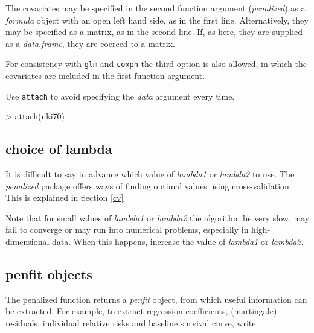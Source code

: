 \documentclass[a4paper]{article}
\newcommand{\Rfunction}[1]{{\texttt{#1}}}
\newcommand{\Rpackage}[1]{{\textit{#1}}}
\newcommand{\Rclass}[1]{{\textit{#1}}}
\newcommand{\Rfunarg}[1]{{\textit{#1}}}
\begin{document}
The covariates may be specified in the second function argument (\Rfunarg{penalized}) as a \Rclass{formula} object with an open left hand side, as in the first line. Alternatively, they may be specified as a matrix, as in the second line. If, as here, they are supplied as a \Rclass{data.frame}, they are coerced to a matrix.

For consistency with \Rfunction{glm} and \Rfunction{coxph} the third option is also allowed, in which the covariates are included in the first function argument.

Use \Rfunction{attach} to avoid specifying the \Rfunarg{data} argument every time.

\begin{Schunk}
\begin{Sinput}
> attach(nki70)
\end{Sinput}
\end{Schunk}

\subsection{choice of lambda}

It is difficult to say in advance which value of \Rfunarg{lambda1} or \Rfunarg{lambda2} to use. The \Rpackage{penalized} package offers ways of finding optimal values using cross-validation. This is explained in Section \ref{cv}

Note that for small values of \Rfunarg{lambda1} or \Rfunarg{lambda2} the algorithm be very slow, may fail to converge or may run into numerical problems, especially in high-dimensional data. When this happens, increase the value of \Rfunarg{lambda1} or \Rfunarg{lambda2}.


\subsection{penfit objects}

The penalized function returns a \Rclass{penfit} object, from which useful information can be extracted. For example, to extract regression coefficients, (martingale) residuals, individual relative risks and baseline survival curve, write
\end{document}
